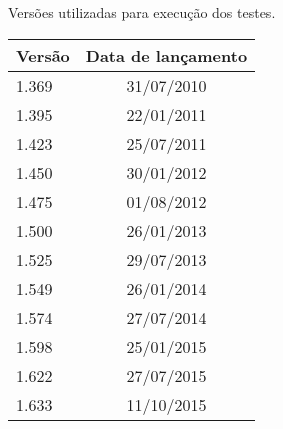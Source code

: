\begin{quadro}[!htb]
	\centering
	\caption{Versões utilizadas para execução dos testes.}
	\label{tab:versionTabs}
	\begin{tabular}{|l|c|}
		\hline
		\textbf{Versão} & \textbf{Data de lançamento} \\ \hline
		1.369           & 31/07/2010            \\ \hline
		1.395           & 22/01/2011            \\ \hline
		1.423           & 25/07/2011            \\ \hline
		1.450           & 30/01/2012            \\ \hline
		1.475           & 01/08/2012            \\ \hline
		1.500           & 26/01/2013            \\ \hline
		1.525           & 29/07/2013            \\ \hline
		1.549           & 26/01/2014            \\ \hline
		1.574           & 27/07/2014            \\ \hline
		1.598           & 25/01/2015            \\ \hline
		1.622           & 27/07/2015            \\ \hline
		1.633           & 11/10/2015           \\ \hline
	\end{tabular}
\end{quadro}
